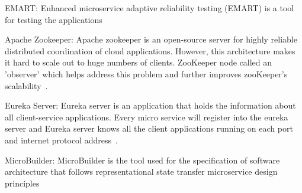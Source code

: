 \par EMART: Enhanced microservice adaptive reliability testing (EMART) is a tool for testing the applications~\cite{Russo2020}

\par Apache Zookeeper: Apache zookeeper is an open-source server for highly reliable distributed coordination of cloud applications. However, this architecture makes it hard to scale out to huge numbers of clients. ZooKeeper node called an 'observer' which helps address this problem and further improves zooKeeper's scalability~\cite{Kalske2017paper, KalskeM2017}.

\par Eureka Server: Eureka server is an application that holds the information about all client-service applications. Every micro service will register into the eureka server and Eureka server knows all the client applications running on each port and internet protocol address~\cite{Uber}.

\par MicroBuilder: MicroBuilder is the tool used for the specification of software architecture that follows representational state transfer microservice design principles~\cite{Branko2018} 


